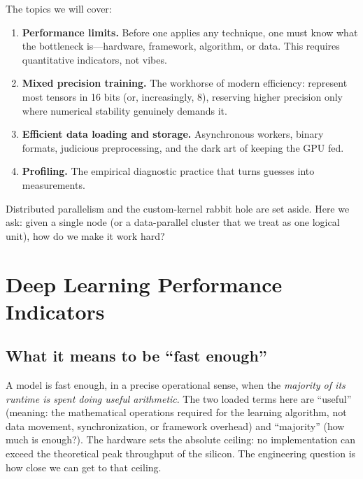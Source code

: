 \documentclass[11pt,a4paper]{article}
\theoremstyle{definition}
\theoremstyle{remark}
\theoremstyle{plain}
\begin{document}
The topics we will cover:
\begin{enumerate}[leftmargin=1.8em, itemsep=2pt]
    \item \textbf{Performance limits.} Before one applies any technique,
          one must know what the bottleneck is---hardware, framework,
          algorithm, or data. This requires quantitative indicators, not
          vibes.
    \item \textbf{Mixed precision training.} The workhorse of modern
          efficiency: represent most tensors in 16 bits (or,
          increasingly, 8), reserving higher precision only where
          numerical stability genuinely demands it.
    \item \textbf{Efficient data loading and storage.} Asynchronous
          workers, binary formats, judicious preprocessing, and the dark
          art of keeping the GPU fed.
    \item \textbf{Profiling.} The empirical diagnostic practice that
          turns guesses into measurements.
\end{enumerate}

Distributed parallelism and the custom-kernel rabbit hole are set
aside. Here we ask: given a single node (or
a data-parallel cluster that we treat as one logical unit), how do we
make it work hard?

\section{Deep Learning Performance Indicators}
\label{sec:indicators}

\subsection{What it means to be ``fast enough''}

A model is fast enough, in a precise operational sense, when the
\emph{majority of its runtime is spent doing useful arithmetic}. The two
loaded terms here are ``useful'' (meaning: the mathematical operations
required for the learning algorithm, not data movement, synchronization,
or framework overhead) and ``majority'' (how much is enough?). The
hardware sets the absolute ceiling: no implementation can exceed the
theoretical peak throughput of the silicon. The engineering question is
how close we can get to that ceiling.
\end{document}
